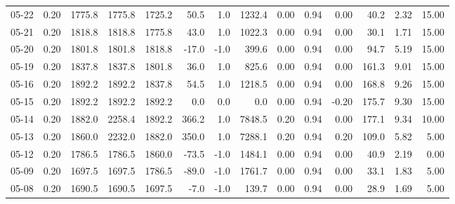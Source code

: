 \begin{threeparttable}
{\begin{tabular}{lrrrrrrrrrrrrr}
  05-22 &     0.20 & 1775.8 & 1775.8 & 1725.2 &       50.5 &                      1.0 &              1232.4 &       0.00 &      0.94 &           0.00 &             40.2 &            2.32 &                  15.00 \\
  05-21 &     0.20 & 1818.8 & 1818.8 & 1775.8 &       43.0 &                      1.0 &              1022.3 &       0.00 &      0.94 &           0.00 &             30.1 &            1.71 &                  15.00 \\
  05-20 &     0.20 & 1801.8 & 1801.8 & 1818.8 &      -17.0 &                     -1.0 &               399.6 &       0.00 &      0.94 &           0.00 &             94.7 &            5.19 &                  15.00 \\
  05-19 &     0.20 & 1837.8 & 1837.8 & 1801.8 &       36.0 &                      1.0 &               825.6 &       0.00 &      0.94 &           0.00 &            161.3 &            9.01 &                  15.00 \\
  05-16 &     0.20 & 1892.2 & 1892.2 & 1837.8 &       54.5 &                      1.0 &              1218.5 &       0.00 &      0.94 &           0.00 &            168.8 &            9.26 &                  15.00 \\
  05-15 &     0.20 & 1892.2 & 1892.2 & 1892.2 &        0.0 &                      0.0 &                 0.0 &       0.00 &      0.94 &          -0.20 &            175.7 &            9.30 &                  15.00 \\
  05-14 &     0.20 & 1882.0 & 2258.4 & 1892.2 &      366.2 &                      1.0 &              7848.5 &       0.20 &      0.94 &           0.00 &            177.1 &            9.34 &                  10.00 \\
  05-13 &     0.20 & 1860.0 & 2232.0 & 1882.0 &      350.0 &                      1.0 &              7288.1 &       0.20 &      0.94 &           0.20 &            109.0 &            5.82 &                   5.00 \\
  05-12 &     0.20 & 1786.5 & 1786.5 & 1860.0 &      -73.5 &                     -1.0 &              1484.1 &       0.00 &      0.94 &           0.00 &             40.9 &            2.19 &                   0.00 \\
  05-09 &     0.20 & 1697.5 & 1697.5 & 1786.5 &      -89.0 &                     -1.0 &              1761.7 &       0.00 &      0.94 &           0.00 &             33.1 &            1.83 &                   5.00 \\
  05-08 &     0.20 & 1690.5 & 1690.5 & 1697.5 &       -7.0 &                     -1.0 &               139.7 &       0.00 &      0.94 &           0.00 &             28.9 &            1.69 &                   5.00 \\

\end{tabular}}
\end{threeparttable}
